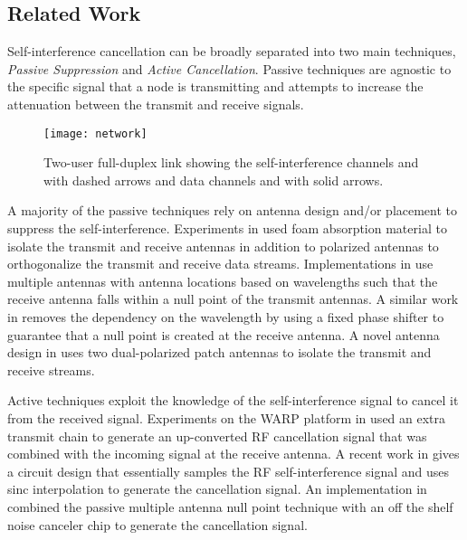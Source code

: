 \documentclass[12pt, journal,draftcls,letterpaper,onecolumn]{IEEEtran}
\begin{document}
\subsection{Related Work}
\label{subsec:related_work}
Self-interference cancellation can be broadly separated into two main techniques, \emph{Passive Suppression} and \emph{Active Cancellation}.  Passive techniques are agnostic to the specific signal that a node is transmitting and attempts to increase the attenuation between the transmit and receive signals.  
\begin{figure}[htp] 
\begin{center} 
  \texttt{[image: network]}
\caption[fig:system]{Two-user full-duplex link showing the self-interference channels  and  with dashed arrows and data channels  and  with solid arrows.} 
  \label{fig:network}
\end{center}    
\end{figure}    
A majority of the passive techniques rely on antenna design and/or placement to suppress the self-interference.  Experiments in \cite{2013_Evan_TWC_passive} used foam absorption material to isolate the transmit and receive antennas in addition to polarized antennas to orthogonalize the transmit and receive data streams.  Implementations in \cite{2011_Antenna_cancel,2012_Choi_Asilomar} use multiple antennas with antenna locations based on wavelengths such that the receive antenna falls within a null point of the transmit antennas.  A similar work in \cite{2012_MIDU} removes the dependency on the wavelength by using a fixed phase shifter to guarantee that a null point is created at the receive antenna.  A novel antenna design in\cite{2010_Patch_Sweden} uses two dual-polarized patch antennas to isolate the transmit and receive streams.  

Active techniques exploit the knowledge of the self-interference signal to cancel it from the received signal.  Experiments on the WARP platform in \cite{2012_Melissa_TWC} used an extra transmit chain to generate an up-converted RF cancellation signal that was combined with the incoming signal at the receive antenna.  A recent work in \cite{2013_Stanford_Sigcomm} gives a circuit design that essentially samples the RF self-interference signal and uses sinc interpolation to generate the cancellation signal.  An implementation in \cite{2010_low_power} combined the passive multiple antenna null point technique with an off the shelf noise canceler chip to generate the cancellation signal.  
\end{document}
